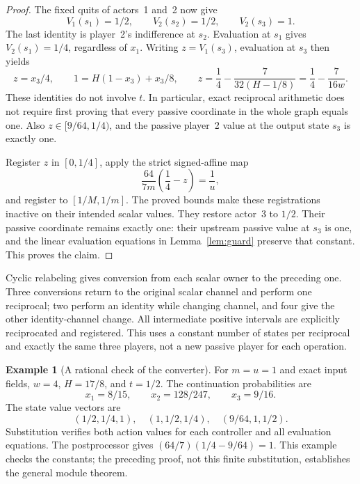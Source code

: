 \documentclass[11pt,a4paper]{article}
\numberwithin{equation}{section}
\theoremstyle{definition}
\newtheorem{example}[theorem]{Example}
\begin{document}
\begin{proof}
The fixed quits of actors~1 and~2 now give
\[
 V_1(s_1)=1/2,\qquad V_2(s_2)=1/2,\qquad V_2(s_3)=1.
\]
The last identity is player~2's indifference at \(s_2\).
Evaluation at \(s_1\) gives \(V_2(s_1)=1/4\), regardless of \(x_1\).
Writing \(z=V_1(s_3)\), evaluation at \(s_3\) then yields
\begin{equation}\label{eq:recipidentity}
 z=x_3/4,\qquad 1=H(1-x_3)+x_3/8,\qquad
 z=\frac14-\frac7{32(H-1/8)}=\frac14-\frac7{16w}.
\end{equation}
These identities do not involve \(t\). In particular, exact reciprocal
arithmetic does not require first proving that every passive coordinate
in the whole graph equals one. Also \(z\in[9/64,1/4)\), and the
passive player~2 value at the output state \(s_3\) is exactly one.

Register \(z\) in \([0,1/4]\), apply the strict signed-affine map
\begin{equation}\label{eq:recippost}
 \frac{64}{7m}\left(\frac14-z\right)=\frac1u,
\end{equation}
and register to \([1/M,1/m]\). The proved bounds make these registrations
inactive on their intended scalar values. They restore actor~3 to
\(1/2\). Their passive coordinate remains exactly one: their upstream
passive value at \(s_3\) is one, and the linear evaluation equations
in Lemma~\ref{lem:guard} preserve that constant. This proves the claim.
\end{proof}

Cyclic relabeling gives conversion from each scalar owner to the
preceding one. Three conversions return to the original scalar channel
and perform one reciprocal; two perform an identity while changing
channel, and four give the other identity-channel change. All intermediate
positive intervals are explicitly reciprocated and registered. This
uses a constant number of states per reciprocal and exactly the same
three players, not a new passive player for each operation.

\begin{example}[A rational check of the converter]
For \(m=u=1\) and exact input fields, \(w=4\), \(H=17/8\), and
\(t=1/2\). The continuation probabilities are
\[
 x_1=8/15,\qquad x_2=128/247,\qquad x_3=9/16.
\]
The state value vectors are
\[
 (1/2,1/4,1),\quad(1,1/2,1/4),\quad(9/64,1,1/2).
\]
Substitution verifies both action values for each controller and all
evaluation equations. The postprocessor gives
\((64/7)(1/4-9/64)=1\). This example checks the constants; the
preceding proof, not this finite substitution, establishes the general
module theorem.
\end{example}
\end{document}

